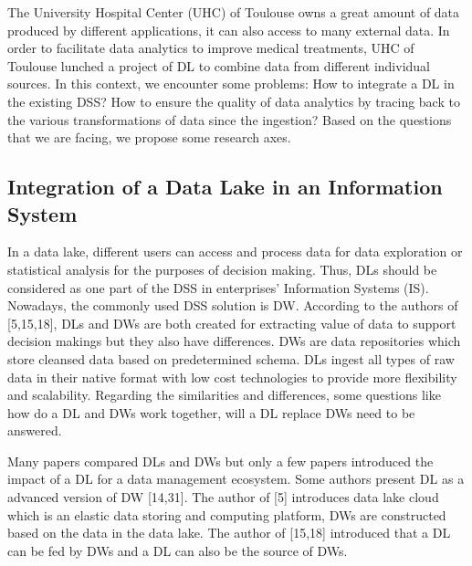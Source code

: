 \documentclass[a4paper,12pt,notitlepage,twoside,openright]{article}
\begin{document}
The University Hospital Center (UHC) of Toulouse owns a great amount of
data produced by different applications, it can also access to many
external data. In order to facilitate data analytics to improve medical
treatments, UHC of Toulouse lunched a project of DL to combine data from
different individual sources. In this context, we encounter some
problems: How to integrate a DL in the existing DSS? How to ensure the
quality of data analytics by tracing back to the various transformations
of data since the ingestion? Based on the questions that we are facing,
we propose some research axes.

\hypertarget{integration-of-a-data-lake-in-an-information-system}{%
\subsection{Integration of a Data Lake in an Information
System}\label{integration-of-a-data-lake-in-an-information-system}}

In a data lake, different users can access and process data for data
exploration or statistical analysis for the purposes of decision making.
Thus, DLs should be considered as one part of the DSS in enterprises'
Information Systems (IS). Nowadays, the commonly used DSS solution is
DW. According to the authors of {[}5,15,18{]}, DLs and DWs are both
created for extracting value of data to support decision makings but
they also have differences. DWs are data repositories which store
cleansed data based on predetermined schema. DLs ingest all types of raw
data in their native format with low cost technologies to provide more
flexibility and scalability. Regarding the similarities and differences,
some questions like how do a DL and DWs work together, will a DL replace
DWs need to be answered.

Many papers compared DLs and DWs but only a few papers introduced the
impact of a DL for a data management ecosystem. Some authors present DL
as a advanced version of DW {[}14,31{]}. The author of {[}5{]}
introduces data lake cloud which is an elastic data storing and
computing platform, DWs are constructed based on the data in the data
lake. The author of {[}15,18{]} introduced that a DL can be fed by DWs
and a DL can also be the source of DWs.
\end{document}
